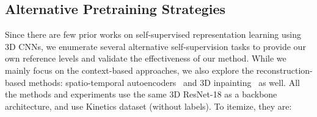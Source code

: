 \documentclass[letterpaper]{article} \usepackage{aaai19}  \usepackage{times}  \usepackage{helvet}  \usepackage{courier}  \usepackage{url}  \usepackage{graphicx}  \frenchspacing  \setlength{\pdfpagewidth}{8.5in}  \setlength{\pdfpageheight}{11in}
\begin{document}
\subsection{Alternative Pretraining Strategies}
Since there are few prior works on self-supervised representation learning using 3D CNNs, we enumerate several alternative self-supervision tasks to provide our own reference levels and validate the effectiveness of our method. While we mainly focus on the context-based approaches, we also explore the reconstruction-based methods: spatio-temporal autoencoders~\cite{zhao2017spatio} and 3D inpainting~\cite{Pathak2016inpainting} as well. All the methods and experiments use the same 3D ResNet-18 as a backbone architecture, and use Kinetics dataset (without labels). To itemize, they are: 

\begin{table}
\centering
{}
\caption{\textbf{comparison with alternative methods.} Top-1 accuracies on UCF10. All methods use 3D ResNet-18, and the accuracies are averaged over three splits.}
\label{tab:alternatives}
\end{table}
\end{document}
